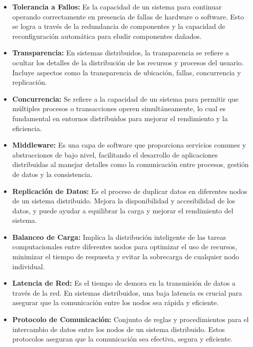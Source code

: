 \begin{itemize}
	\item \textbf{Tolerancia a Fallos:} Es la capacidad de un sistema para continuar operando correctamente en presencia de fallas de hardware o software. Esto se logra a través de la redundancia de componentes y la capacidad de reconfiguración automática para eludir componentes dañados.
	
	\item \textbf{Transparencia:} En sistemas distribuidos, la transparencia se refiere a ocultar los detalles de la distribución de los recursos y procesos del usuario. Incluye aspectos como la transparencia de ubicación, fallas, concurrencia y replicación.
	
	\item \textbf{Concurrencia:} Se refiere a la capacidad de un sistema para permitir que múltiples procesos o transacciones operen simultáneamente, lo cual es fundamental en entornos distribuidos para mejorar el rendimiento y la eficiencia.
	
	\item \textbf{Middleware:} Es una capa de software que proporciona servicios comunes y abstracciones de bajo nivel, facilitando el desarrollo de aplicaciones distribuidas al manejar detalles como la comunicación entre procesos, gestión de datos y la consistencia.
	
	\item \textbf{Replicación de Datos:} Es el proceso de duplicar datos en diferentes nodos de un sistema distribuido. Mejora la disponibilidad y accesibilidad de los datos, y puede ayudar a equilibrar la carga y mejorar el rendimiento del sistema.
	
	\item \textbf{Balanceo de Carga:} Implica la distribución inteligente de las tareas computacionales entre diferentes nodos para optimizar el uso de recursos, minimizar el tiempo de respuesta y evitar la sobrecarga de cualquier nodo individual.
	
	\item \textbf{Latencia de Red:} Es el tiempo de demora en la transmisión de datos a través de la red. En sistemas distribuidos, una baja latencia es crucial para asegurar que la comunicación entre los nodos sea rápida y eficiente.
	
	\item \textbf{Protocolo de Comunicación:} Conjunto de reglas y procedimientos para el intercambio de datos entre los nodos de un sistema distribuido. Estos protocolos aseguran que la comunicación sea efectiva, segura y eficiente.
	

\end{itemize}
